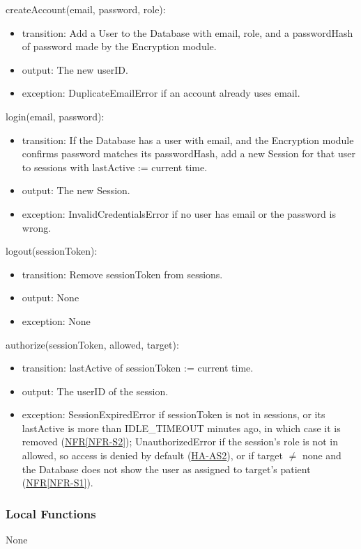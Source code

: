 \documentclass[12pt, titlepage]{article}
\newcommand{\srsref}[2]{\href{https://github.com/Nour-Fawaz/MacaBoca/blob/main/pdfs/SRS/SRS.pdf}{#1\ref*{#2}}}
\newcommand{\hazref}[1]{\href{https://github.com/Nour-Fawaz/MacaBoca/blob/main/pdfs/HazardAnalysis/HazardAnalysis.pdf}{#1}}
\begin{document}
\noindent createAccount(email, password, role):
\begin{itemize}
\item transition: Add a User to the Database with email, role, and a
  passwordHash of password made by the Encryption module.
\item output: The new userID.
\item exception: DuplicateEmailError if an account already uses email.
\end{itemize}

\noindent login(email, password):
\begin{itemize}
\item transition: If the Database has a user with email, and the Encryption
  module confirms password matches its passwordHash, add a new Session for
  that user to sessions with lastActive := current time.
\item output: The new Session.
\item exception: InvalidCredentialsError if no user has email or the password
  is wrong.
\end{itemize}

\noindent logout(sessionToken):
\begin{itemize}
\item transition: Remove sessionToken from sessions.
\item output: None
\item exception: None
\end{itemize}

\noindent authorize(sessionToken, allowed, target):
\begin{itemize}
\item transition: lastActive of sessionToken := current time.
\item output: The userID of the session.
\item exception: SessionExpiredError if sessionToken is not in sessions, or
  its lastActive is more than IDLE\_TIMEOUT minutes ago, in which case it is
  removed (\srsref{NFR}{NFR-S2}); UnauthorizedError if the session's role is
  not in allowed, so access is denied by default (\hazref{HA-AS2}), or if
  target $\neq$ none and
  the Database does not show the user as assigned to target's patient (\srsref{NFR}{NFR-S1}).
\end{itemize}

\subsubsection{Local Functions}
None
\end{document}
